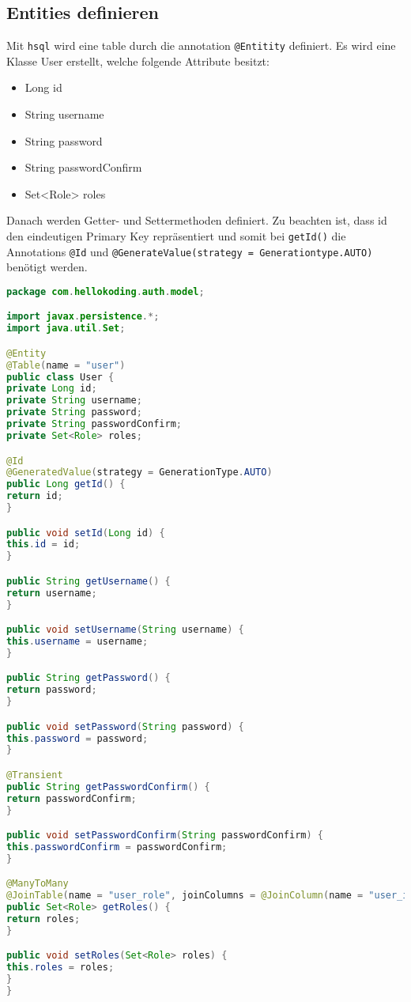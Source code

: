 \subsection{Entities definieren}
Mit \verb|hsql| wird eine table durch die annotation \verb|@Entitity| definiert. Es wird eine Klasse User erstellt, welche folgende Attribute besitzt:

\begin{itemize}
	\item Long id
	\item String username
	\item String password
	\item String passwordConfirm
	\item Set<Role> roles
\end{itemize} 

Danach werden Getter- und Settermethoden definiert. Zu beachten ist, dass id den eindeutigen Primary Key repräsentiert und somit bei \verb|getId()| die Annotations \verb|@Id| und \verb|@GenerateValue(strategy = Generationtype.AUTO)| benötigt werden.

\begin{lstlisting}[language=java]
package com.hellokoding.auth.model;

import javax.persistence.*;
import java.util.Set;

@Entity
@Table(name = "user")
public class User {
private Long id;
private String username;
private String password;
private String passwordConfirm;
private Set<Role> roles;

@Id
@GeneratedValue(strategy = GenerationType.AUTO)
public Long getId() {
return id;
}

public void setId(Long id) {
this.id = id;
}

public String getUsername() {
return username;
}

public void setUsername(String username) {
this.username = username;
}

public String getPassword() {
return password;
}

public void setPassword(String password) {
this.password = password;
}

@Transient
public String getPasswordConfirm() {
return passwordConfirm;
}

public void setPasswordConfirm(String passwordConfirm) {
this.passwordConfirm = passwordConfirm;
}

@ManyToMany
@JoinTable(name = "user_role", joinColumns = @JoinColumn(name = "user_id"), inverseJoinColumns = @JoinColumn(name = "role_id"))
public Set<Role> getRoles() {
return roles;
}

public void setRoles(Set<Role> roles) {
this.roles = roles;
}
}
\end{lstlisting}